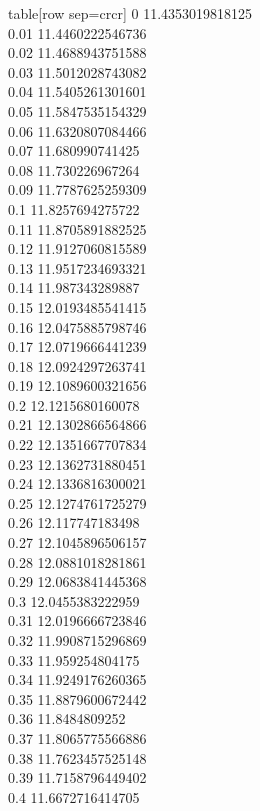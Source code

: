   table[row sep=crcr]{%
0	11.4353019818125\\
0.01	11.4460222546736\\
0.02	11.4688943751588\\
0.03	11.5012028743082\\
0.04	11.5405261301601\\
0.05	11.5847535154329\\
0.06	11.6320807084466\\
0.07	11.680990741425\\
0.08	11.730226967264\\
0.09	11.7787625259309\\
0.1	11.8257694275722\\
0.11	11.8705891882525\\
0.12	11.9127060815589\\
0.13	11.9517234693321\\
0.14	11.987343289887\\
0.15	12.0193485541415\\
0.16	12.0475885798746\\
0.17	12.0719666441239\\
0.18	12.0924297263741\\
0.19	12.1089600321656\\
0.2	12.1215680160078\\
0.21	12.1302866564866\\
0.22	12.1351667707834\\
0.23	12.1362731880451\\
0.24	12.1336816300021\\
0.25	12.1274761725279\\
0.26	12.117747183498\\
0.27	12.1045896506157\\
0.28	12.0881018281861\\
0.29	12.0683841445368\\
0.3	12.0455383222959\\
0.31	12.0196666723846\\
0.32	11.9908715296869\\
0.33	11.959254804175\\
0.34	11.9249176260365\\
0.35	11.8879600672442\\
0.36	11.8484809252\\
0.37	11.8065775566886\\
0.38	11.7623457525148\\
0.39	11.7158796449402\\
0.4	11.6672716414705\\
}
